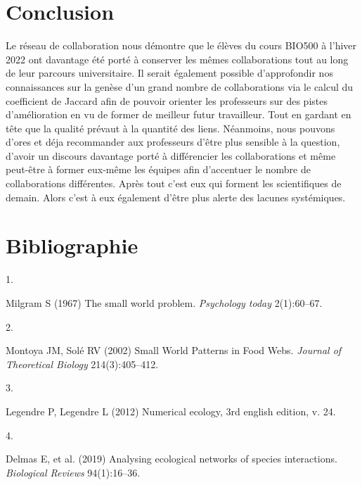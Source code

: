 \documentclass[9pt,twocolumn,twoside,]{pnas-new}
\newlength{\cslhangindent}
\newlength{\csllabelwidth}
\newlength{\cslentryspacingunit} %
\newenvironment{CSLReferences}[2] %
 {%
  \setlength{\parindent}{0pt}
  \ifodd #1
  \let\oldpar\par
  \def\par{\hangindent=\cslhangindent\oldpar}
  \fi
  \setlength{\parskip}{#2\cslentryspacingunit}
 }%
 {}
\newcommand{\CSLLeftMargin}[1]{\parbox[t]{\csllabelwidth}{#1}}
\newcommand{\CSLRightInline}[1]{\parbox[t]{\linewidth - \csllabelwidth}{#1}\break}
\begin{document}
\hypertarget{conclusion}{%
\section{Conclusion}\label{conclusion}}

Le réseau de collaboration nous démontre que le élèves du cours BIO500 à
l'hiver 2022 ont davantage été porté à conserver les mêmes
collaborations tout au long de leur parcours universitaire. Il serait
également possible d'approfondir nos connaissances sur la genèse d'un
grand nombre de collaborations via le calcul du coefficient de Jaccard
afin de pouvoir orienter les professeurs sur des pistes d'amélioration
en vu de former de meilleur futur travailleur. Tout en gardant en tête
que la qualité prévaut à la quantité des liens. Néanmoins, nous pouvons
d'ores et déja recommander aux professeurs d'être plus sensible à la
question, d'avoir un discours davantage porté à différencier les
collaborations et même peut-être à former eux-même les équipes afin
d'accentuer le nombre de collaborations différentes. Après tout c'est
eux qui forment les scientifiques de demain. Alors c'est à eux également
d'être plus alerte des lacunes systémiques.

\newpage

\hypertarget{bibliographie}{%
\section*{Bibliographie}\label{bibliographie}}

\hypertarget{refs}{}
\begin{CSLReferences}{0}{0}
\leavevmode\hypertarget{ref-milgram1967small}{}%
\CSLLeftMargin{1. }
\CSLRightInline{Milgram S (1967) The small world problem.
\emph{Psychology today} 2(1):60--67.}

\leavevmode\hypertarget{ref-montoya2002small}{}%
\CSLLeftMargin{2. }
\CSLRightInline{Montoya JM, Solé RV (2002) Small {World} {Patterns} in
{Food} {Webs}. \emph{Journal of Theoretical Biology} 214(3):405--412.}

\leavevmode\hypertarget{ref-legendre2012numerical}{}%
\CSLLeftMargin{3. }
\CSLRightInline{Legendre P, Legendre L (2012) Numerical ecology, 3rd
english edition, v. 24.}

\leavevmode\hypertarget{ref-delmas2019analysing}{}%
\CSLLeftMargin{4. }
\CSLRightInline{Delmas E, et al. (2019) Analysing ecological networks of
species interactions. \emph{Biological Reviews} 94(1):16--36.}

\end{CSLReferences}



% 
\end{document}
